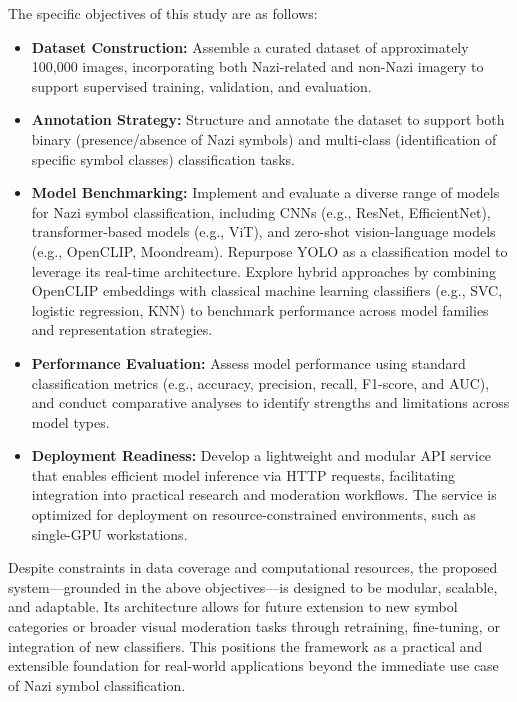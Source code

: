 The specific objectives of this study are as follows:

\begin{itemize}
\item \textbf{Dataset Construction:} Assemble a curated dataset of approximately 100,000 images, incorporating both
Nazi-related and non-Nazi imagery to support supervised training, validation, and evaluation.

\item \textbf{Annotation Strategy:} Structure and annotate the dataset to support both binary (presence/absence of
Nazi symbols) and multi-class (identification of specific symbol classes) classification tasks.

\item \textbf{Model Benchmarking:} Implement and evaluate a diverse range of models for Nazi symbol classification,
including \ac{CNN}s (e.g., \ac{ResNet}, EfficientNet), transformer-based models (e.g., \ac{ViT}),
and zero-shot vision-language models (e.g., OpenCLIP, Moondream). Repurpose \ac{YOLO} as a classification model to
leverage its real-time architecture. Explore hybrid approaches by combining OpenCLIP embeddings with classical
machine learning classifiers (e.g., \ac{SVC}, logistic regression, KNN) to benchmark performance across model
families and representation strategies.

\item \textbf{Performance Evaluation:} Assess model performance using standard classification metrics (e.g.,
accuracy, precision, recall, F1-score, and \ac{AUC}), and conduct comparative analyses to identify strengths and
limitations across model types.

\item \textbf{Deployment Readiness:} Develop a lightweight and modular API service that enables efficient model
inference via HTTP requests, facilitating integration into practical research and moderation workflows. The service
is optimized for deployment on resource-constrained environments, such as single-GPU workstations.
\end{itemize}

Despite constraints in data coverage and computational resources, the proposed system—grounded in the above
objectives—is designed to be modular, scalable, and adaptable. Its architecture allows for future extension to new
symbol categories or broader visual moderation tasks through retraining, fine-tuning, or integration of new
classifiers. This positions the framework as a practical and extensible foundation for real-world applications
beyond the immediate use case of Nazi symbol classification.

